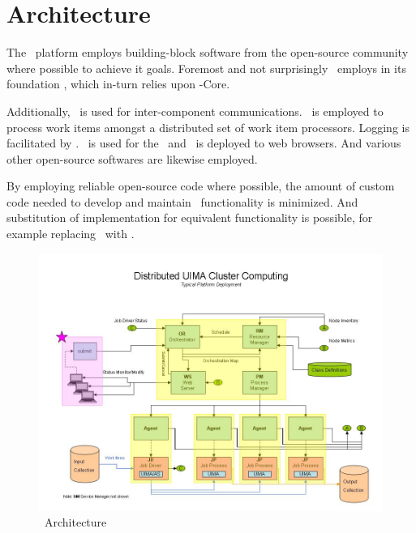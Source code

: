     \section{Architecture}
    
    The \varDUCC~platform employs building-block software from the open-source community
    where possible to achieve it goals. Foremost and not surprisingly \varDUCC~employs in
    its foundation \varUIMAAS, which in-turn relies upon \varUIMA-Core.
    
    Additionally, \varCamel~is used for inter-component communications.
    \varActiveMQ~is employed to process work items amongst a distributed set of work item processors.
    Logging is facilitated by \varLogger. \varJetty~is used for the \varWebServer~and \varjQuery~is deployed
    to web browsers.  And various other open-source softwares are likewise employed.
    
    By employing reliable open-source code where possible, the amount of custom code needed
    to develop and maintain \varDUCC~functionality is minimized. And substitution of implementation
    for equivalent functionality is possible, for example replacing \varApacheActiveMQ~with 
    \varIBMWebSphereMQ.
    
    \begin{figure}[h]
    \centering
    \includegraphics[width=6.5in]{images/ducc-arch.jpg}
    \caption{\varDUCC~Architecture}
    \label{fig:\varDUCC~Architecture}
    \end{figure}

    \section{\varJobs}

